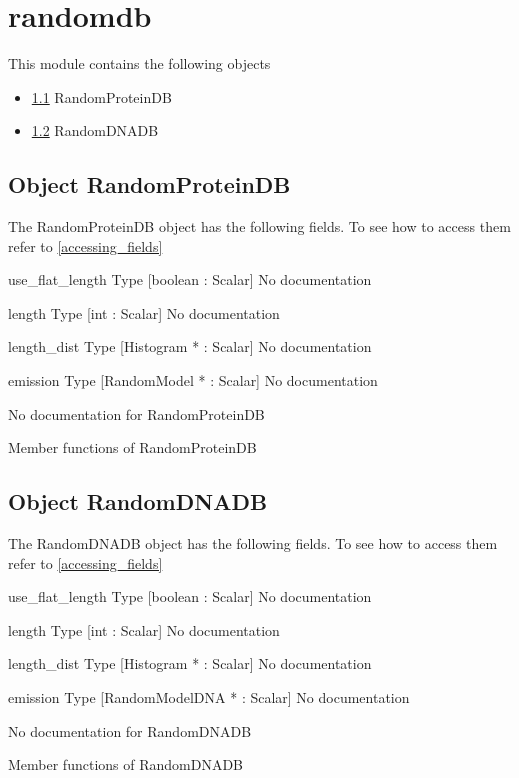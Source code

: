 \section{randomdb}
\label{module_randomdb}
This module contains the following objects

\begin{itemize}
\item \ref{object_RandomProteinDB} RandomProteinDB

\item \ref{object_RandomDNADB} RandomDNADB

\end{itemize}
\subsection{Object RandomProteinDB}

\label{object_RandomProteinDB}

The RandomProteinDB object has the following fields. To see how to access them refer to \ref{accessing_fields}
\begin{description}
\item{use_flat_length} Type [boolean : Scalar] No documentation

\item{length} Type [int : Scalar] No documentation

\item{length_dist} Type [Histogram * : Scalar] No documentation

\item{emission} Type [RandomModel * : Scalar] No documentation

\end{description}
No documentation for RandomProteinDB

Member functions of RandomProteinDB

\subsection{Object RandomDNADB}

\label{object_RandomDNADB}

The RandomDNADB object has the following fields. To see how to access them refer to \ref{accessing_fields}
\begin{description}
\item{use_flat_length} Type [boolean : Scalar] No documentation

\item{length} Type [int : Scalar] No documentation

\item{length_dist} Type [Histogram * : Scalar] No documentation

\item{emission} Type [RandomModelDNA * : Scalar] No documentation

\end{description}
No documentation for RandomDNADB

Member functions of RandomDNADB

